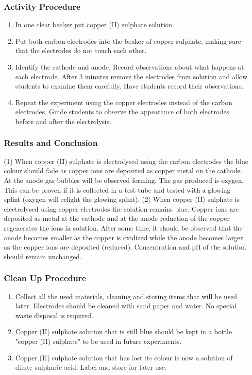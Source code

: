 \subsubsection*{Activity Procedure}
\begin{enumerate}
\item{In one clear beaker put copper (II) sulphate solution.}
\item{Put both carbon electrodes into the beaker of copper sulphate, making sure that the electrodes do not touch each other.}
\item{Identify the cathode and anode. Record observations about what happens at each electrode. After 3 minutes remove the electrodes from solution and allow students to examine them carefully. Have students record their observations.}
\item{Repeat the experiment using the copper electrodes instead of the carbon electrodes. Guide students to observe the appearance of both electrodes before and after the electrolysis.}
\end{enumerate}

\subsubsection*{Results and Conclusion}
(1) When copper (II) sulphate is electrolysed using the carbon electrodes the blue colour should fade as copper ions are deposited as copper metal on the cathode.  At the anode gas bubbles will be observed forming. The gas produced is oxygen. This can be proven if it is collected in a test tube and tested with a glowing splint (oxygen will relight the glowing splint).
(2) When copper (II) sulphate is electrolysed using copper electrodes the solution remains blue. Copper ions are deposited as metal at the cathode and at the anode reduction of the copper regenerates the ions in solution. After some time, it should be observed that the anode becomes smaller as the copper is oxidized while the anode becomes larger as the copper ions are deposited (reduced). Concentration and pH of the solution should remain unchanged.

\subsubsection*{Clean Up Procedure}
\begin{enumerate}
\item{Collect all the used materials, cleaning and storing items that will be used later. Electrodes should be cleaned with sand paper and water. No special waste disposal is required.}
\item{Copper (II) sulphate solution that is still blue should be kept in a bottle "copper (II) sulphate" to be used in future experiments.}
\item{Copper (II) sulphate solution that has lost its colour is now a solution of dilute sulphuric acid. Label and store for later use.}
\end{enumerate}

